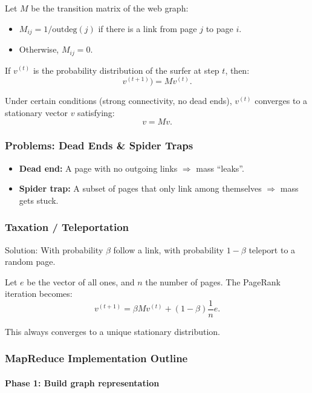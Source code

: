 \documentclass[11pt]{article}
\begin{document}
Let $M$ be the transition matrix of the web graph:
\begin{itemize}
    \item $M_{ij} = 1/\text{outdeg}(j)$ if there is a link from page $j$ to page $i$.
    \item Otherwise, $M_{ij} = 0$.
\end{itemize}

If $v^{(t)}$ is the probability distribution of the surfer at step $t$, then:
\[
    v^{(t+1)}) = M v^{(t)}.
\]

Under certain conditions (strong connectivity, no dead ends), $v^{(t)}$ converges to a stationary vector $v$ satisfying:
\[
    v = Mv.
\]

\subsubsection*{Problems: Dead Ends \& Spider Traps}

\begin{itemize}
    \item \textbf{Dead end:} A page with no outgoing links $\Rightarrow$ mass ``leaks''.
    \item \textbf{Spider trap:} A subset of pages that only link among themselves $\Rightarrow$ mass gets stuck.
\end{itemize}

\subsubsection*{Taxation / Teleportation}

Solution: With probability $\beta$ follow a link, with probability $1-\beta$ teleport to a random page.

Let $e$ be the vector of all ones, and $n$ the number of pages. The PageRank iteration becomes:
\[
    v^{(t+1)} = \beta M v^{(t)} + (1 - \beta)\frac{1}{n} e.
\]

This always converges to a unique stationary distribution.

\subsubsection*{MapReduce Implementation Outline}

\paragraph{Phase 1: Build graph representation}
\end{document}

